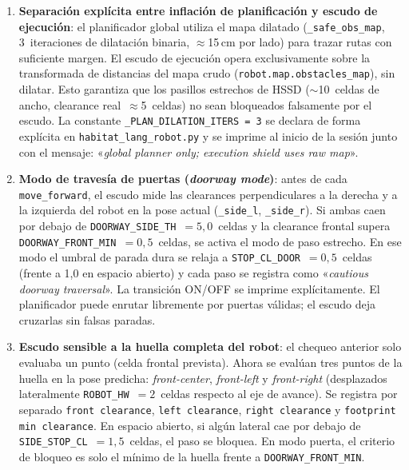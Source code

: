 \documentclass[11pt,a4paper]{article}
\begin{document}
\begin{enumerate}

  \item \textbf{Separación explícita entre inflación de planificación y escudo
        de ejecución}: el planificador global utiliza el mapa dilatado
        (\texttt{\_safe\_obs\_map}, 3~iteraciones de dilatación binaria,
        $\approx$15\,cm por lado) para trazar rutas con suficiente margen.
        El escudo de ejecución opera exclusivamente sobre la transformada de
        distancias del mapa crudo (\texttt{robot.map.obstacles\_map}), sin
        dilatar. Esto garantiza que los pasillos estrechos de HSSD
        ($\sim$10~celdas de ancho, clearance real~$\approx$5~celdas) no sean
        bloqueados falsamente por el escudo. La constante
        \texttt{\_PLAN\_DILATION\_ITERS = 3} se declara de forma explícita en
        \texttt{habitat\_lang\_robot.py} y se imprime al inicio de la sesión
        junto con el mensaje: «\textit{global planner only; execution shield
        uses raw map}».

  \item \textbf{Modo de travesía de puertas (\textit{doorway mode})}: antes de
        cada \texttt{move\_forward}, el escudo mide las clearances
        perpendiculares a la derecha y a la izquierda del robot en la pose
        actual (\texttt{\_side\_l}, \texttt{\_side\_r}). Si ambas caen por
        debajo de \texttt{DOORWAY\_SIDE\_TH}~$= 5{,}0$~celdas y la clearance
        frontal supera \texttt{DOORWAY\_FRONT\_MIN}~$= 0{,}5$~celdas, se
        activa el modo de paso estrecho. En ese modo el umbral de parada dura
        se relaja a \texttt{STOP\_CL\_DOOR}~$= 0{,}5$~celdas (frente a
        1{,}0 en espacio abierto) y cada paso se registra como
        «\textit{cautious doorway traversal}». La transición
        ON/OFF se imprime explícitamente. El planificador puede enrutar
        libremente por puertas válidas; el escudo deja cruzarlas sin falsas
        paradas.

  \item \textbf{Escudo sensible a la huella completa del robot}: el chequeo
        anterior solo evaluaba un punto (celda frontal prevista). Ahora se
        evalúan tres puntos de la huella en la pose predicha:
        \textit{front-center}, \textit{front-left} y \textit{front-right}
        (desplazados lateralmente \texttt{ROBOT\_HW}~$= 2$~celdas respecto
        al eje de avance). Se registra por separado
        \texttt{front clearance}, \texttt{left clearance},
        \texttt{right clearance} y \texttt{footprint min clearance}. En
        espacio abierto, si algún lateral cae por debajo de
        \texttt{SIDE\_STOP\_CL}~$= 1{,}5$~celdas, el paso se bloquea. En
        modo puerta, el criterio de bloqueo es solo el mínimo de la huella
        frente a \texttt{DOORWAY\_FRONT\_MIN}.


\end{enumerate}
\end{document}
